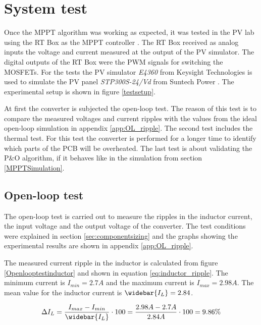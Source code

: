 \section{System test} \label{systemtest}
Once the MPPT algorithm was working as expected, it was tested in the PV lab using the RT Box as the MPPT controller \cite{RTbox}. The RT Box received as analog inputs the voltage and current measured at the output of the PV simulator. The digital outputs of the RT Box were the PWM signals for switching the MOSFETs. For the tests the PV simulator \textit{E4360} from Keysight Technologies \cite{PV_simulator} is used to simulate the PV panel \textit{STP300S-24/Vd} from Suntech Power \cite{PV_panel}.  The experimental setup is shown in figure \ref{testsetup}.

 At first the converter is subjected the open-loop test. The reason of this test is to compare the measured voltages and current ripples with the values from the ideal open-loop simulation in appendix \ref{app:OL_ripple}. The second test includes the thermal test. For this test the converter is performed for a longer time to identify which parts of the PCB will be overheated. The last test is about validating the P\&O algorithm, if it behaves like in the simulation from section \ref{MPPTSimulation}.



\subsection{Open-loop test}

The open-loop test is carried out to measure the ripples in the inductor current, the input voltage and the output voltage of the converter. The test conditions were explained in section \ref{sec:componentsizing} and the graphs showing the experimental results are shown in appendix \ref{app:OL_ripple}.

The measured current ripple in the inductor is calculated from figure \ref{Openlooptestinductor} and shown in equation \ref{eq:inductor_ripple}. The minimum current is $I_{min} = 2.7A$ and the maximum current is $I_{max} = 2.98A$. The mean value for the inductor current is $\widebar{I_L}= 2.84$. 

\begin{equation} \label{eq:inductor_rippleexpirment}
\Delta I_L = \frac{I_{max}-I_{min}}{\widebar{I_L}} \cdot 100 = \frac{2.98A-2.7A}{2.84A} \cdot 100 = 9.86\%
\end{equation}

